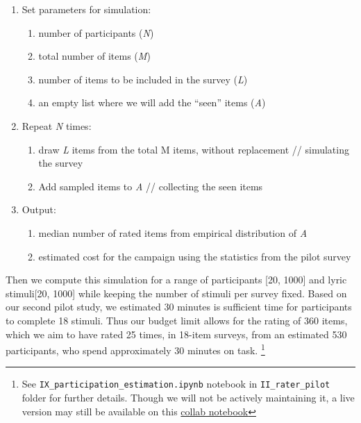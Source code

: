 \documentclass[
  letterpaper,
  DIV=11,
  numbers=noendperiod]{scrartcl}
\providecommand{\tightlist}{%
  \setlength{\itemsep}{0pt}\setlength{\parskip}{0pt}}\usepackage{longtable,booktabs,array}
\begin{document}
\begin{enumerate}
\def\labelenumi{\arabic{enumi}.}
\tightlist
\item
  Set parameters for simulation:

  \begin{enumerate}
  \def\labelenumii{\alph{enumii})}
  \tightlist
  \item
    number of participants (\emph{N})
  \item
    total number of items (\emph{M})
  \item
    number of items to be included in the survey (\emph{L})
  \item
    an empty list where we will add the ``seen'' items (\emph{A})
  \end{enumerate}
\item
  Repeat \emph{N} times:

  \begin{enumerate}
  \def\labelenumii{\alph{enumii})}
  \tightlist
  \item
    draw \emph{L} items from the total M items, without replacement //
    simulating the survey
  \item
    Add sampled items to \emph{A} // collecting the seen items
  \end{enumerate}
\item
  Output:

  \begin{enumerate}
  \def\labelenumii{\alph{enumii})}
  \tightlist
  \item
    median number of rated items from empirical distribution of \emph{A}
  \item
    estimated cost for the campaign using the statistics from the pilot
    survey
  \end{enumerate}
\end{enumerate}

Then we compute this simulation for a range of participants {[}20,
1000{]} and lyric stimuli{[}20, 1000{]} while keeping the number of
stimuli per survey fixed. Based on our second pilot study, we estimated
30 minutes is sufficient time for participants to complete 18 stimuli.
Thus our budget limit allows for the rating of 360 items, which we aim
to have rated 25 times, in 18-item surveys, from an estimated 530
participants, who spend approximately 30 minutes on task. \footnote{See
  \texttt{IX\_participation\_estimation.ipynb} notebook in
  \texttt{II\_rater\_pilot} folder for further details. Though we will
  not be actively maintaining it, a live version may still be available
  on this
  \href{https://colab.research.google.com/drive/1-gp0lTBTVe0lmHBJEz1K5HHg6dmNpUEE\#scrollTo=nMSiUmCX2oEY}{collab
  notebook}}
\end{document}
